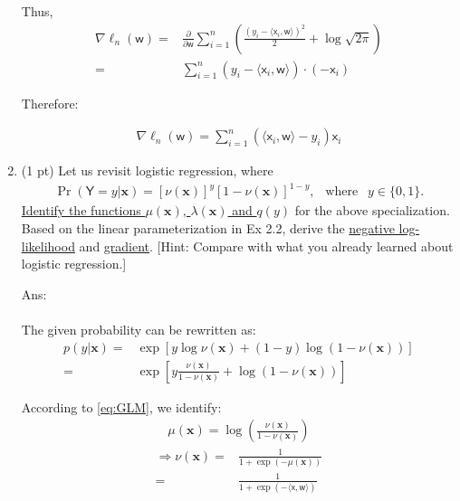 \documentclass[10pt]{article}
\newcommand{\xv}{\mathbf{x}}
\newcommand{\inner}[2]{\langle #1, #2 \rangle}
\newcommand{\xbs}{\bm{\mathsf{x}}}
\newcommand{\wbs}{\bm{\mathsf{w}}}
\newcommand{\Ysf}{\mathsf{Y}}
\newcommand{\ans}[1]{{\color{orange}\textsf{Ans}: #1}}
\begin{document}
\begin{exercise}
\begin{enumerate}
          Thus,
          \begin{equation*}
            \begin{aligned}
              \nabla \ell_n(\wbs) = & \frac{\partial}{\partial \wbs}\sum_{i=1}^n \left( \frac{(y_i - \inner{\xbs_i}{\wbs})^2}{2} + \log \sqrt{2\pi} \right) \\
              =                     & \sum_{i=1}^n (y_i - \inner{\xbs_i}{\wbs}) \cdot (-\xbs_i)
            \end{aligned}
          \end{equation*}

          Therefore:

          \begin{align}
            \boxed{\nabla \ell_n(\wbs) = \sum_{i=1}^n (\inner{\xbs_i}{\wbs}-y_i) \xbs_i}
          \end{align}
          {\vskip0.5cm}
    \item (1 pt) Let us revisit logistic regression, where
          \begin{align}
            \Pr( \Ysf = y | \xv) =[\nu(\xv)]^{y} [1-\nu(\xv)]^{1-y}, ~~\mbox{ where } ~~ y \in \{0, 1\}.
          \end{align}
          \uline{Identify the functions $\mu(\xv)$, $\lambda(\xv)$ and $q(y)$} for the above specialization. Based on the linear parameterization in Ex 2.2, derive the \uline{negative log-likelihood} and \uline{gradient}.  [Hint: Compare with what you already learned about logistic regression.]

          \ans\\
          \leavevmode\\
          The given probability can be rewritten as:
          \begin{equation*}
            \begin{aligned}
              p(y|\xv) = & \exp\left[ y \log \nu(\xv) + (1-y) \log (1-\nu(\xv)) \right]         \\
              =          & \exp\left[ y \frac{\nu(\xv)}{1-\nu(\xv)} + \log (1-\nu(\xv)) \right]
            \end{aligned}
          \end{equation*}

          According to \eqref{eq:GLM}, we identify:
          \begin{align}
            \boxed{\mu(\xv) = \log \left(\frac{\nu(\xv)}{1-\nu(\xv)}\right)}
          \end{align}
          \begin{equation*}
            \begin{aligned}
              \Rightarrow \nu(\xv)= & \frac{1}{1+\exp(-\mu(\xv))}           \\
              =                     & \frac{1}{1+\exp(-\inner{\xbs}{\wbs})} \\
            \end{aligned}
          \end{equation*}


\end{enumerate}
\end{exercise}
\end{document}

